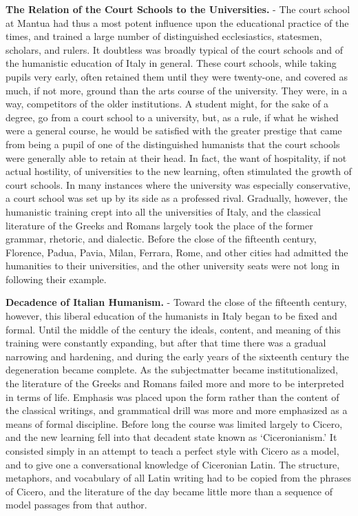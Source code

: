 \documentclass[
]{book}
\begin{document}
\textbf{The Relation of the Court Schools to the Universities.} - The court school at Mantua had thus a most potent influence upon the educational practice of the times, and trained a large number of distinguished ecclesiastics, statesmen, scholars, and rulers. It doubtless was broadly typical of the court schools and of the humanistic education of Italy in general. These court schools, while taking pupils very early, often retained them until they were twenty-one, and covered as much, if not more, ground than the arts course of the university. They were, in a way, competitors of the older institutions. A student might, for the sake of a degree, go from a court school to a university, but, as a rule, if what he wished were a general course, he would be satisfied with the greater prestige that came from being a pupil of one of the distinguished humanists that the court schools were generally able to retain at their head. In fact, the want of hospitality, if not actual hostility, of universities to the new learning, often stimulated the growth of court schools. In many instances where the university was especially conservative, a court school was set up by its side as a professed rival. Gradually, however, the humanistic training crept into all the universities of Italy, and the classical literature of the Greeks and Romans largely took the place of the former grammar, rhetoric, and dialectic. Before the close of the fifteenth century, Florence, Padua, Pavia, Milan, Ferrara, Rome, and other cities had admitted the humanities to their universities, and the other university seats were not long in following their example.

\textbf{Decadence of Italian Humanism.} - Toward the close of the fifteenth century, however, this liberal education of the humanists in Italy began to be fixed and formal. Until the middle of the century the ideals, content, and meaning of this training were constantly expanding, but after that time there was a gradual narrowing and hardening, and during the early years of the sixteenth century the degeneration became complete. As the subjectmatter became institutionalized, the literature of the Greeks and Romans failed more and more to be interpreted in terms of life. Emphasis was placed upon the form rather than the content of the classical writings, and grammatical drill was more and more emphasized as a means of formal discipline. Before long the course was limited largely to Cicero, and the new learning fell into that decadent state known as `Ciceronianism.' It consisted simply in an attempt to teach a perfect style with Cicero as a model, and to give one a conversational knowledge of Ciceronian Latin. The structure, metaphors, and vocabulary of all Latin writing had to be copied from the phrases of Cicero, and the literature of the day became little more than a sequence of model passages from that author.
\end{document}
